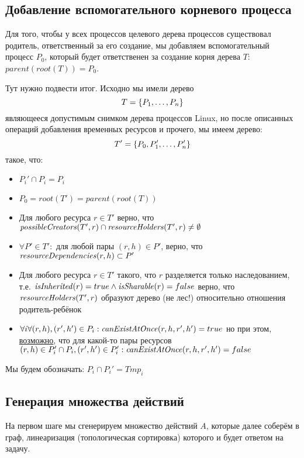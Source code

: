 \subsection{Добавление вспомогательного корневого процесса}

Для того, чтобы у всех процессов целевого дерева процессов существовал родитель, ответственный за его создание, мы добавляем вспомогательный процесс $P_0$, который будет ответственен за создание корня дерева $T$: $parent(root(T)) = P_0$.

Тут нужно подвести итог. Исходно мы имели дерево 
\begin{equation*}
T = \left\lbrace P_1, \ldots, P_n \right\rbrace
\end{equation*} 
являющееся допустимым снимком дерева процессов Linux, но после описанных операций добавления временных ресурсов и прочего, мы имеем дерево:
\begin{equation*}
T' = \left\lbrace P_0, P_1', \ldots, P_n' \right\rbrace
\end{equation*}
такое, что:

\begin{itemize}
	\item $P_i' \cap P_i = P_i$
	\item $P_0 = root(T') = parent(root(T))$
	\item Для любого ресурса $r \in T'$ верно, что $\text{\textit{possibleCreators}}(T', r) \cap \text{\textit{resourceHolders}}(T', r) \neq \emptyset$
	\item $\forall P' \in T': $ для любой пары $(r, h) \in P'$, верно, что $\text{\textit{resourceDependencies}}(r, h) \subset P'$
	\item Для любого ресурса $r \in T'$ такого, что $r$ разделяется только наследованием, т.е. $\text{\textit{isInherited}}(r) = true \land \text{\textit{isSharable}}(r) = false$ верно, что $\text{\textit{resourceHolders}}(T', r)$ образуют дерево (не лес!) относительно отношения родитель-ребёнок
	\item $\forall i \forall (r, h), (r', h') \in P_i: \text{\textit{canExistAtOnce}}(r, h, r', h') = true$ но при этом, \underline{возможно}, что для какой-то пары ресурсов $(r, h) \in P_i' \cap P_i, (r', h') \in P_i': \text{\textit{canExistAtOnce}}(r, h, r', h') = false$
\end{itemize}

Мы будем обозначать: $P_i \cap P_i' = Tmp_i$

\subsection{Генерация множества действий}

На первом шаге мы сгенерируем множество действий $A$, которые далее соберём в граф, линеаризация (топологическая сортировка) которого и будет ответом на задачу.

